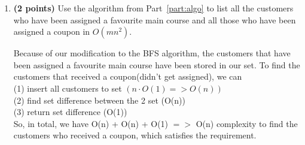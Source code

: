 \documentclass{assignment-373}
\begin{document}
\begin{enumerate}
    
    \item \textbf{(2 points)} Use the algorithm from Part~\ref{part:algo} to list all the customers who have been assigned a favourite main course and all those who have been assigned a coupon in $O(mn^2)$.
    
    \phantom{=} \phantom{=} Because of our modification to the BFS algorithm, the customers that have been assigned a favourite main course have been stored in our set. To find the customers that received a coupon(didn't get assigned), we can\\
    \phantom{=} \phantom{=} \phantom{=} (1) insert all customers to set $(n\cdot O(1) => O(n))$\\
    \phantom{=} \phantom{=} \phantom{=} (2) find set difference between the 2 set (O(n))\\
    \phantom{=} \phantom{=} \phantom{=} (3) return set difference (O(1))\\
    
    \phantom{=} \phantom{=} So, in total, we have O(n) + O(n) + O(1) $=>$ O(n) complexity to find the customers who received a coupon, which satisfies the requirement.\\
    
\end{enumerate}
\end{document}
